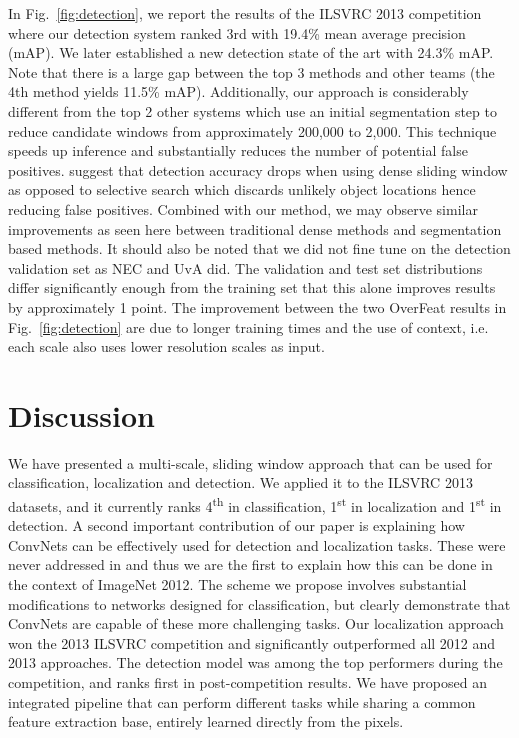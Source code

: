 \documentclass{article} %
\newcommand{\fig}[1]{Fig.~\ref{fig:#1}}
\begin{document}
In \fig{detection}, we report the results of the ILSVRC 2013 competition
 where our detection system ranked 3rd with 19.4\% mean average precision (mAP).
We later established a new detection state of the art with 24.3\% mAP.
Note that there is a large gap between
the top 3 methods and other teams (the 4th method yields 11.5\% mAP).
Additionally, our approach is considerably different from the top 2 other systems
which use an initial segmentation step to reduce candidate windows from
approximately 200,000 to 2,000. This technique speeds up inference and substantially
reduces the number of potential false positives.
\cite{UijlingsIJCV2013,carreira2012object}
suggest that detection accuracy drops when using dense sliding window
as opposed to selective search which discards unlikely object locations
hence reducing false positives.
Combined with our method,
we may observe similar improvements as seen here between traditional dense methods
and segmentation based methods.
It should also be noted that we did not fine tune on the detection validation set
as NEC and UvA did. The validation and test set distributions differ significantly
enough from the training set that this alone improves results by approximately 1 point.
The improvement between the two OverFeat results in \fig{detection}
are due to longer training times
and the use of context, i.e. each scale also uses lower resolution scales as input.

\section{Discussion}
\label{sec:discussion}

We have presented a multi-scale, sliding window approach that can be used
for classification, localization and detection.
We applied it to the ILSVRC 2013 datasets, and
it currently ranks 4\textsuperscript{th} in classification, 1\textsuperscript{st}
in localization and 1\textsuperscript{st} in detection.
A second important contribution of our paper
is explaining how ConvNets can be effectively used for detection and
localization tasks. These were never addressed in \cite{Kriz12} and
thus we are the first to explain how this can be done in the context
of ImageNet 2012.  The scheme we propose involves substantial
modifications to networks designed for classification, but clearly
demonstrate that ConvNets are capable of these more challenging
tasks. Our localization approach won the 2013 ILSVRC competition
and significantly outperformed all 2012 and 2013 approaches.
The detection model was among the top performers during the competition,
and ranks first in post-competition results.
We have proposed an integrated pipeline that can perform different tasks
while sharing a common feature extraction base, entirely learned
directly from the pixels.
\end{document}
